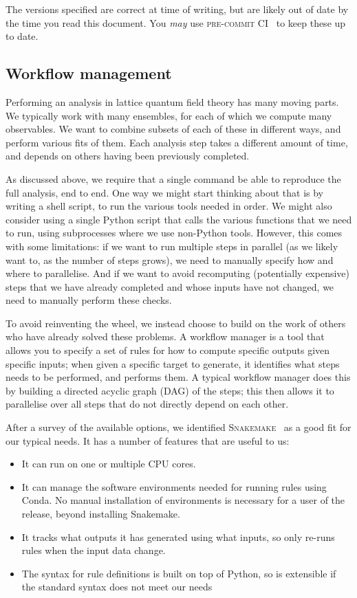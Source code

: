 \documentclass{article}
\newcommand\rfcword[1]{\emph{#1}\xspace}
\newcommand\may{\rfcword{may}}
\newcommand\program[1]{\textsc{#1}\xspace}
\begin{document}
The versions specified are correct at time of writing,
but are likely out of date by the time you read this document.
You \may use \program{pre-commit CI}~\cite{pre-commit-ci} to keep these up to date.

\subsection{Workflow management}

Performing an analysis in lattice quantum field theory has many moving parts.
We typically work with many ensembles,
for each of which we compute many observables.
We want to combine subsets of each of these in different ways,
and perform various fits of them.
Each analysis step takes a different amount of time,
and depends on others having been previously completed.

As discussed above,
we require that a single command be able to reproduce the full analysis,
end to end.
One way we might start thinking about that is by writing a shell script,
to run the various tools needed in order.
We might also consider using a single Python script
that calls the various functions that we need to run,
using subprocesses where we use non-Python tools.
However,
this comes with some limitations:
if we want to run multiple steps in parallel
(as we likely want to,
as the number of steps grows),
we need to manually specify how and where to parallelise.
And if we want to avoid recomputing
(potentially expensive)
steps that we have already completed
and whose inputs have not changed,
we need to manually perform these checks.

To avoid reinventing the wheel,
we instead choose to build on the work of others who have already solved these problems.
A workflow manager is a tool that allows you to specify
a set of rules for how to compute specific outputs given specific inputs;
when given a specific target to generate,
it identifies what steps needs to be performed,
and performs them.
A typical workflow manager does this
by building a directed acyclic graph
(DAG)
of the steps;
this then allows it to parallelise over all steps that do not directly depend on each other.

After a survey of the available options,
we identified \program{Snakemake}~\cite{molder2021sustainable} as a good fit for our typical needs.
It has a number of features that are useful to us:

\begin{itemize}
  \item
        It can run on one or multiple CPU cores.
  \item
        It can manage the software environments needed for running rules using Conda.
        No manual installation of environments is necessary for a user of the release,
        beyond installing Snakemake.
  \item
        It tracks what outputs it has generated using what inputs,
        so only re-runs rules when the input data change.
  \item
        The syntax for rule definitions is built on top of Python,
        so is extensible if the standard syntax does not meet our needs
\end{itemize}
\end{document}
